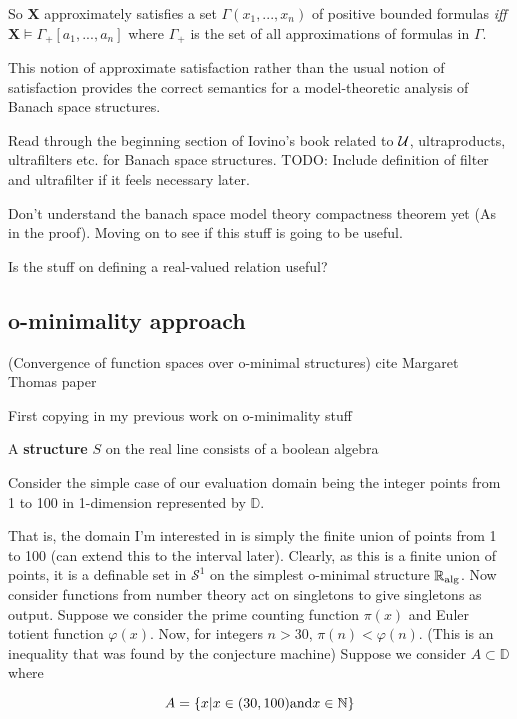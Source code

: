 So $\mathbf{X}$ approximately satisfies a set $\Gamma(x_1,...,x_n)$ of positive bounded formulas \textit{iff} $\mathbf{X}\models\Gamma_{+}[a_1,...,a_n]$ where $\Gamma_{+}$ is the set of all approximations of formulas in $\Gamma$.
\begin{remark}
    This notion of approximate satisfaction rather than the usual notion of satisfaction provides the correct semantics for a model-theoretic analysis of Banach space structures.
\end{remark}

Read through the beginning section of Iovino's book related to $\mathcal{U}$, ultraproducts, ultrafilters etc. for Banach space structures.
TODO: Include definition of filter and ultrafilter if it feels necessary later.

Don't understand the banach space model theory compactness theorem yet (As in the proof). Moving on to see if this stuff is going to be useful.

Is the stuff on defining a real-valued relation useful?
\subsection{o-minimality approach}

(Convergence of function spaces over o-minimal structures) cite Margaret Thomas paper

First copying in my previous work on o-minimality stuff

\begin{definition}[Structure]
    A \textbf{structure} $S$ on the real line consists of a boolean algebra
\end{definition}

Consider the simple case of our evaluation domain being the integer points from 1 to 100 in 1-dimension represented by $\mathbb{D}$.

That is, the domain I'm interested in is simply the finite union of points from 1 to 100 (can extend this to the interval later). Clearly, as this is a finite union of points, it is a definable set in $\mathcal{S}^1$ on the simplest o-minimal structure $\mathbb{R}_{\text{alg}}$.
Now consider functions from number theory act on singletons to give singletons as output. Suppose we consider the prime counting function $\pi(x)$ and Euler totient function $\varphi(x)$. Now, for integers $n > 30$, $\pi(n) < \varphi(n)$. (This is an inequality that was found by the conjecture machine)
Suppose we consider $A\subset\mathbb{D}$ where

\begin{equation*}
    A = \{x | x\in (30, 100) \text{and} x\in\mathbb{N} \}
\end{equation*}

